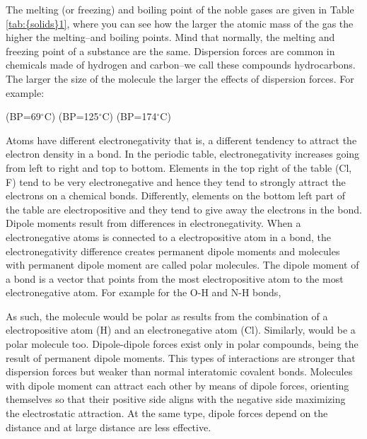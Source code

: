 \documentclass[main.tex]{subfiles}
\newcommand\chapterlabel{solids}
\begin{document}
\begin{description}
The melting (or freezing) and boiling point of the noble gases are given in Table \ref{tab:{\chapterlabel}1}, where you can see how the larger the atomic mass of the gas the higher the melting--and boiling points. Mind that normally, the melting and freezing point of a substance are the same. Dispersion forces are common in chemicals made of hydrogen and carbon--we call these compounds hydrocarbons. The larger the size of the molecule the larger the effects of dispersion forces. For example:
\begin{center} (BP=69$^\circ$C)\hspace{1cm}
(BP=125$^\circ$C)\hspace{1cm}
(BP=174$^\circ$C)\end{center}



\item[\docfilehook{Dipole-Dipole forces}{}] 
Atoms have different electronegativity that is, a different tendency to attract the electron density in a bond. 
In the periodic table, electronegativity increases going from left to right and top to bottom. Elements in the top right of the table (Cl, F) tend to be very electronegative and hence they tend to strongly attract the electrons on a chemical bonds. Differently, elements on the bottom left part of the table are electropositive and they tend to give away the electrons in the bond. Dipole moments result from differences in electronegativity. When a electronegative atoms is connected to a electropositive atom in a bond, the electronegativity difference creates permanent dipole moments and molecules with permanent dipole moment are called polar molecules. The dipole moment of a bond is a vector that points from the most electropositive atom to the most electronegative atom. For example for the O-H and N-H bonds,
\begin{center}
\qquad
{}
\end{center}
As such, the molecule  would be polar as results from the combination of a electropositive atom (H) and an electronegative atom (Cl). Similarly,  would be a polar molecule too. Dipole-dipole forces exist only in polar compounds, being the result of permanent dipole moments.  This types of interactions are stronger that dispersion forces but weaker than normal interatomic covalent bonds. Molecules with dipole moment can attract each other by means of dipole forces, orienting themselves so that their positive side aligns with the negative side maximizing the electrostatic attraction. At the same type, dipole forces depend on the distance and at large distance are less effective.



\end{description}
\end{document}
